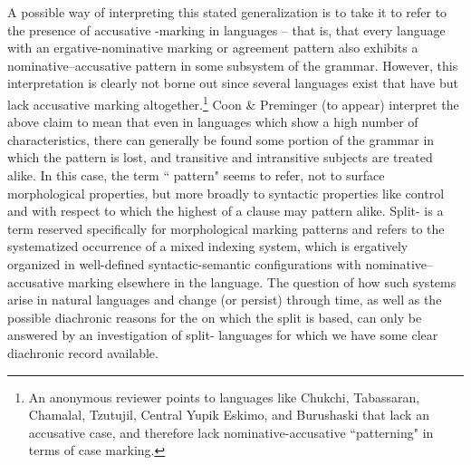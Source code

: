 \documentclass[output=paper,
modfonts
]{LSP/langsci}
\begin{document}
A possible way of interpreting this stated generalization is to take it to refer to the presence of accusative -marking in  languages -- that is, that every language with an ergative-nominative  marking or agreement pattern also exhibits a nominative--accusative  pattern in some subsystem of the grammar.  However, this interpretation is clearly not borne out since several languages exist that   have   but lack  accusative  marking altogether.\footnote{An anonymous reviewer points to  languages  like Chukchi,  Tabassaran, Chamalal, Tzutujil, Central Yupik Eskimo, and  Burushaski that lack an accusative case, and therefore lack nominative-accusative ``patterning" in terms of case marking.}  Coon \& Preminger (to appear)  interpret the above claim  to mean that even in languages  which show a high number of  characteristics,  there can generally be found some portion of the grammar in which the
 pattern is lost, and transitive and intransitive subjects are treated alike. In this case, the term `` pattern" seems to refer, not to surface morphological  properties, but more broadly  to syntactic properties like control and  with respect to which the highest  of a clause may pattern alike.  Split- is a term reserved specifically for morphological marking patterns and  refers to the systematized occurrence of  a mixed indexing system, which is ergatively organized  in  well-defined 
syntactic-semantic configurations with nominative--accusative marking elsewhere in the language.   The question of how such systems arise in natural languages and change (or persist) through time, as well as the possible diachronic reasons for the  on which the split is based,    can only be answered  by an investigation of split- languages for which 
we have some clear diachronic record available.  
\end{document}
